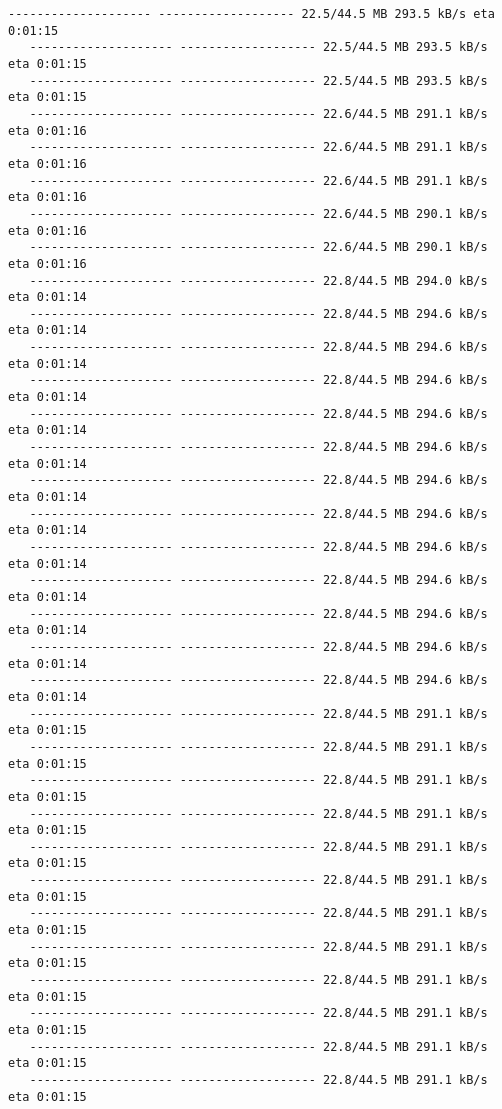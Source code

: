 \documentclass[11pt]{article}
\begin{document}
\begin{Verbatim}[commandchars=\\\{\}]
   -------------------- ------------------- 22.5/44.5 MB 293.5 kB/s eta 0:01:15
   -------------------- ------------------- 22.5/44.5 MB 293.5 kB/s eta 0:01:15
   -------------------- ------------------- 22.5/44.5 MB 293.5 kB/s eta 0:01:15
   -------------------- ------------------- 22.6/44.5 MB 291.1 kB/s eta 0:01:16
   -------------------- ------------------- 22.6/44.5 MB 291.1 kB/s eta 0:01:16
   -------------------- ------------------- 22.6/44.5 MB 291.1 kB/s eta 0:01:16
   -------------------- ------------------- 22.6/44.5 MB 290.1 kB/s eta 0:01:16
   -------------------- ------------------- 22.6/44.5 MB 290.1 kB/s eta 0:01:16
   -------------------- ------------------- 22.8/44.5 MB 294.0 kB/s eta 0:01:14
   -------------------- ------------------- 22.8/44.5 MB 294.6 kB/s eta 0:01:14
   -------------------- ------------------- 22.8/44.5 MB 294.6 kB/s eta 0:01:14
   -------------------- ------------------- 22.8/44.5 MB 294.6 kB/s eta 0:01:14
   -------------------- ------------------- 22.8/44.5 MB 294.6 kB/s eta 0:01:14
   -------------------- ------------------- 22.8/44.5 MB 294.6 kB/s eta 0:01:14
   -------------------- ------------------- 22.8/44.5 MB 294.6 kB/s eta 0:01:14
   -------------------- ------------------- 22.8/44.5 MB 294.6 kB/s eta 0:01:14
   -------------------- ------------------- 22.8/44.5 MB 294.6 kB/s eta 0:01:14
   -------------------- ------------------- 22.8/44.5 MB 294.6 kB/s eta 0:01:14
   -------------------- ------------------- 22.8/44.5 MB 294.6 kB/s eta 0:01:14
   -------------------- ------------------- 22.8/44.5 MB 294.6 kB/s eta 0:01:14
   -------------------- ------------------- 22.8/44.5 MB 294.6 kB/s eta 0:01:14
   -------------------- ------------------- 22.8/44.5 MB 291.1 kB/s eta 0:01:15
   -------------------- ------------------- 22.8/44.5 MB 291.1 kB/s eta 0:01:15
   -------------------- ------------------- 22.8/44.5 MB 291.1 kB/s eta 0:01:15
   -------------------- ------------------- 22.8/44.5 MB 291.1 kB/s eta 0:01:15
   -------------------- ------------------- 22.8/44.5 MB 291.1 kB/s eta 0:01:15
   -------------------- ------------------- 22.8/44.5 MB 291.1 kB/s eta 0:01:15
   -------------------- ------------------- 22.8/44.5 MB 291.1 kB/s eta 0:01:15
   -------------------- ------------------- 22.8/44.5 MB 291.1 kB/s eta 0:01:15
   -------------------- ------------------- 22.8/44.5 MB 291.1 kB/s eta 0:01:15
   -------------------- ------------------- 22.8/44.5 MB 291.1 kB/s eta 0:01:15
   -------------------- ------------------- 22.8/44.5 MB 291.1 kB/s eta 0:01:15
   -------------------- ------------------- 22.8/44.5 MB 291.1 kB/s eta 0:01:15

\end{Verbatim}
\end{document}
